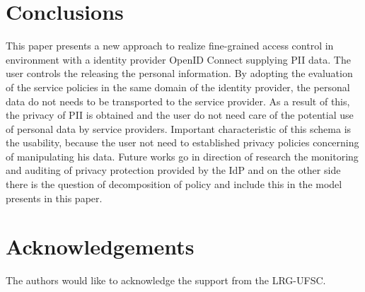 \documentclass{doublecol-new}
\begin{document}
\section{Conclusions}


This paper presents a new approach to realize fine-grained access control in environment with a identity provider OpenID Connect supplying PII data. The user controls the releasing the personal information. By adopting the evaluation of the service policies in the same domain of the identity provider, the personal data do not needs to be transported to the service provider. As a result of this, the privacy of PII is obtained and the user do not need care of the potential use of personal data by service providers. Important characteristic of this schema is the usability, because the user not need to established privacy policies concerning of manipulating his data.
Future works go in direction of research the monitoring and auditing of privacy protection provided by the IdP and on the other side there is the question of decomposition of policy and include this in the model presents in this paper.


\section*{Acknowledgements}
The authors would like to acknowledge the support from the LRG-UFSC.



\end{document}

